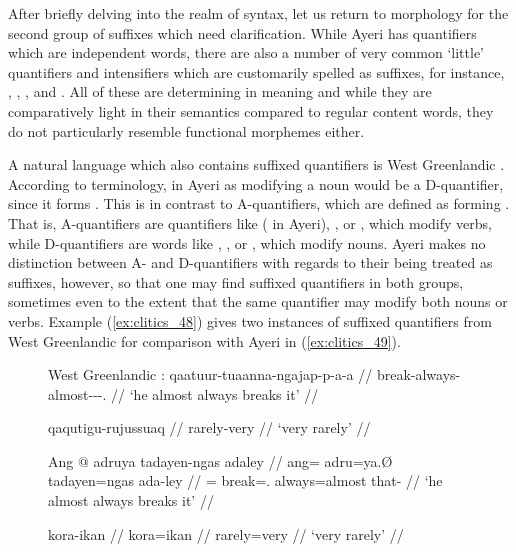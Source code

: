 \label{clitics_quant}
After briefly delving into the realm of syntax, let us return to morphology for
the second group of suffixes which need clarification. While Ayeri has
quantifiers which are independent words, there are also a number of very common
`little' quantifiers and intensifiers which are customarily spelled as
suffixes, for instance, ,
, , and
. All of these are determining in meaning and while
they are comparatively light in their semantics compared to regular content
words, they do not particularly resemble functional morphemes either.

A natural language which also contains suffixed quantifiers is West Greenlandic
\citep{bittner1995}. According to  terminology,
 in Ayeri as modifying a noun would be a D-quantifier, since
it forms .
This is in contrast to A-quantifiers, which are defined as forming
. That is,
A-quantifiers are quantifiers like  ( in Ayeri),
, or , which modify verbs, while D-quantifiers are words
like , , or , which modify nouns. Ayeri makes no
distinction between A- and D-quantifiers with regards to their being treated as
suffixes, however, so that one may find suffixed quantifiers in both groups,
sometimes even to the extent that the same quantifier may modify both nouns or
verbs. Example (\ref{ex:clitics_48}) gives two instances of suffixed
quantifiers from West Greenlandic for comparison with Ayeri in
(\ref{ex:clitics_49}).

\begin{figure}
\pex\label{ex:clitics_48}
West Greenlandic \citep[60, 63]{bittner1995}:
\a\label{ex:clitics_48a}\begingl
	\gla qaatuur-tuaanna-ngajap-p-a-a //
	\glb break-always-almost-\Ind{}-\Tr{}-\Tsg{}.\Tsg{} //
	\glft `he almost always breaks it' //
\endgl

\a\label{ex:clitics_48b}\begingl
	\gla qaqutigu-rujussuaq //
	\glb rarely-very //
	\glft `very rarely' //
\endgl
\xe
\end{figure}

\begin{figure}
\pex\label{ex:clitics_49}
\a\label{ex:clitics_49a}\begingl
	\gla Ang @ adruya tadayen-ngas adaley //
	\glb ang= adru=ya.Ø tadayen=ngas ada-ley //
	\glc \AgtT{}= break=\TsgM{}.\Top{} always=almost that-\PargI{} //
	\glft `he almost always breaks it' //
\endgl

\a\label{ex:clitics_49b}\begingl
	\gla kora-ikan //
	\glb kora=ikan //
	\glc rarely=very //
	\glft `very rarely' //
\endgl
\xe
\end{figure}

